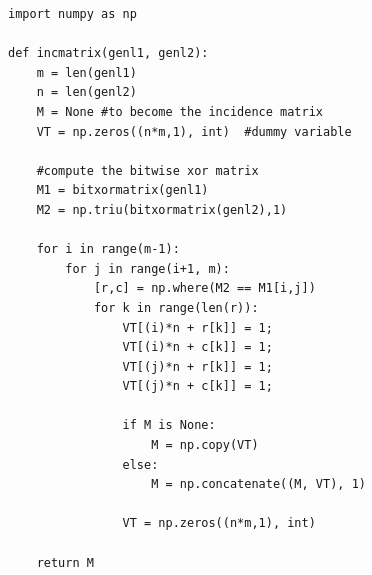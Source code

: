 \documentclass[10pt]{article}
\begin{document}
\begin{tcolorbox}[title = Definition of Python code, skin=standard jigsaw, sharp corners, colback=blue!10, colframe=blue!50, boxrule=0pt]
\begin{verbatim}
import numpy as np

def incmatrix(genl1, genl2):
    m = len(genl1)
    n = len(genl2)
    M = None #to become the incidence matrix
    VT = np.zeros((n*m,1), int)  #dummy variable

    #compute the bitwise xor matrix
    M1 = bitxormatrix(genl1)
    M2 = np.triu(bitxormatrix(genl2),1)  

    for i in range(m-1):
        for j in range(i+1, m):
            [r,c] = np.where(M2 == M1[i,j])
            for k in range(len(r)):
                VT[(i)*n + r[k]] = 1;
                VT[(i)*n + c[k]] = 1;
                VT[(j)*n + r[k]] = 1;
                VT[(j)*n + c[k]] = 1;

                if M is None:
                    M = np.copy(VT)
                else:
                    M = np.concatenate((M, VT), 1)

                VT = np.zeros((n*m,1), int)
    
    return M
\end{verbatim}
\end{tcolorbox}







\begin{tcolorbox}[title = Definition of Python code, skin=standard jigsaw, sharp corners, colback=blue!10, colframe=blue!50, boxrule=0pt]
\inputminted{python}{sample2.py}
\end{tcolorbox}





\begin{tcolorbox}[title = Definition of MATLAB code, skin=standard jigsaw, sharp corners, colback=blue!10, colframe=blue!50, boxrule=0pt]
\inputminted{matlab}{polyfit_graph.m}
\end{tcolorbox}
\end{document}
